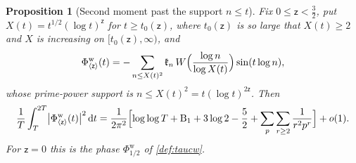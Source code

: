 \documentclass[11pt,a4paper]{article}
\numberwithin{equation}{section}
\newtheorem{proposition}[theorem]{Proposition}
\theoremstyle{definition}
\theoremstyle{remark}
\newcommand{\dd}{\,\mathrm dt}
\begin{document}
\begin{proposition}[Second moment past the support $n\le t$]\label{prop:taucw-beyond}
Fix $0\le\mathsf z<\frac32$, put $X(t)=t^{1/2}(\log t)^{\mathsf z}$ for $t\ge t_0(\mathsf z)$, where $t_0(\mathsf z)$ is so large that $X(t)\ge2$ and $X$ is increasing on $[t_0(\mathsf z),\infty)$, and
\begin{equation}\label{eq:taucw-beyond-def}
\Phi^{\mathrm w}_{\langle\mathsf z\rangle}(t)=-\sum_{n\le X(t)^2}\mathfrak k_n\,W\Bigl(\frac{\log n}{\log X(t)}\Bigr)\sin(t\log n),
\end{equation}
whose prime-power support is $n\le X(t)^2=t(\log t)^{2\mathsf z}$. Then
\begin{equation}\label{eq:taucw-beyond}
\frac1T\int_T^{2T}\bigl|\Phi^{\mathrm w}_{\langle\mathsf z\rangle}(t)\bigr|^2\dd=\frac1{2\pi^2}\Bigl[\log\log T+\mathrm B_1+3\log2-\frac52+\sum_p\sum_{r\ge2}\frac1{r^2p^r}\Bigr]+o(1).
\end{equation}
For $\mathsf z=0$ this is the phase $\Phi^{\mathrm w}_{1/2}$ of \cref{def:taucw}.
\end{proposition}
\end{document}
